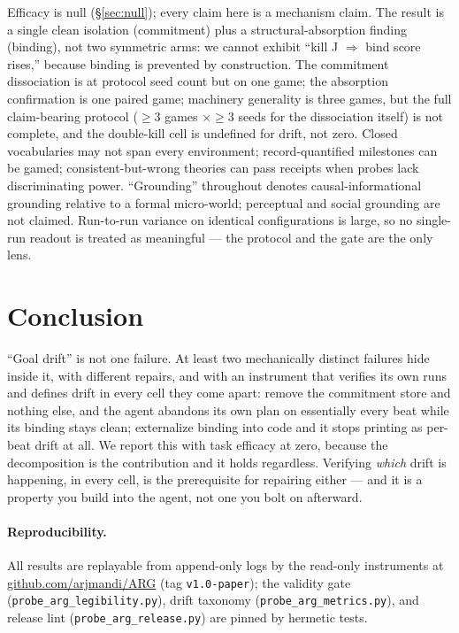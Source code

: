 \documentclass{article}
\newif\ifanon
\begin{document}
Efficacy is null (\S\ref{sec:null}); every claim here is a mechanism claim. The
result is a single clean isolation (commitment) plus a structural-absorption finding
(binding), not two symmetric arms: we cannot exhibit ``kill J $\Rightarrow$ bind
score rises,'' because binding is prevented by construction. The commitment
dissociation is at protocol seed count but on one game; the absorption confirmation
is one paired game; machinery generality is three games, but the full claim-bearing
protocol ($\geq 3$ games $\times \geq 3$ seeds for the dissociation itself) is not
complete, and the double-kill cell is undefined for drift, not zero. Closed
vocabularies may not span every environment; record-quantified milestones can be
gamed; consistent-but-wrong theories can pass receipts when probes lack
discriminating power. ``Grounding'' throughout denotes causal-informational
grounding relative to a formal micro-world; perceptual and social grounding are not
claimed. Run-to-run variance on identical configurations is large, so no single-run
readout is treated as meaningful --- the protocol and the gate are the only lens.

\section{Conclusion}

``Goal drift'' is not one failure. At least two mechanically distinct failures hide
inside it, with different repairs, and with an instrument that verifies its own runs
and defines drift in every cell they come apart: remove the commitment store and
nothing else, and the agent abandons its own plan on essentially every beat while
its binding stays clean; externalize binding into code and it stops printing as
per-beat drift at all. We report this with task efficacy at zero, because
the decomposition is the contribution and it holds regardless. Verifying \emph{which}
drift is happening, in every cell, is the prerequisite for repairing either --- and
it is a property you build into the agent, not one you bolt on afterward.

\ifanon
\paragraph{Reproducibility.} All results are replayable from append-only logs by
read-only instruments in an anonymized repository accompanying the submission; the
validity gate, shadow reference, and drift taxonomy are pinned by hermetic tests.
\else
\paragraph{Reproducibility.} All results are replayable from append-only logs by
the read-only instruments at \href{https://github.com/arjmandi/ARG}{github.com/arjmandi/ARG}
(tag \texttt{v1.0-paper}); the validity gate (\texttt{probe\_arg\_legibility.py}),
drift taxonomy (\texttt{probe\_arg\_metrics.py}), and release lint
(\texttt{probe\_arg\_release.py}) are pinned by hermetic tests.
\fi



\end{document}

